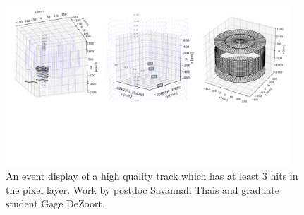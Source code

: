 \documentclass[preprint,12pt]{elsarticle}
\begin{document}
\begin{figure}[htbp]
\centering
     \includegraphics[trim=0 400 0 0,clip,width=0.95\textwidth]{Good_Track_event_display.jpeg}
     \caption{An event display of a high quality track which has at least 3 hits in the pixel layer. Work by postdoc Savannah Thais and graduate student Gage DeZoort.}
     \label{fig:goodtracks}
\end{figure}
\end{document}
